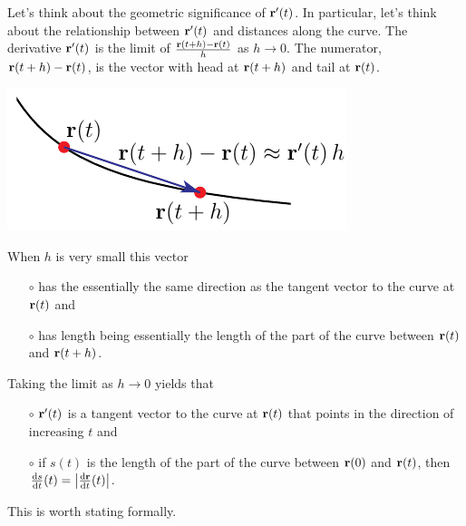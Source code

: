 Let's think about the geometric significance of $\mathbf{r}'(t)$.
In particular, let's think about the relationship between $\mathbf{r}'(t)$
and distances along the curve.
The derivative $\mathbf{r}'(t)$ is the limit of   $\frac{\mathbf{r}(t+h)-\mathbf{r}(t)}{h}$ as $h\rightarrow 0$. 
The numerator, $\mathbf{r}(t+h)-\mathbf{r}(t)$, is the vector with head at $\mathbf{r}(t+h)$ 
and tail at $\mathbf{r}(t)$. 
\begin{efig}
\begin{center}
     \includegraphics{parCurveDeriv.pdf}
\end{center}
\end{efig}
When $h$ is very small this vector
\begin{itemize}\itemsep1pt \parskip0pt  %
\item[$\circ$]
has the essentially the same direction as the tangent vector to the curve at $\mathbf{r}(t)$ and
\item[$\circ$]
has length being essentially the length of the part of the curve between
$\mathbf{r}(t)$ and $\mathbf{r}(t+h)$.
\end{itemize}
Taking the limit as $h\rightarrow 0$ yields that
\begin{itemize}\itemsep1pt \parskip0pt  %
\item[$\circ$]
$\mathbf{r}'(t)$ is a tangent vector to the curve at $\mathbf{r}(t)$ that points in
the direction of increasing $t$ and
\item[$\circ$]
if $s(t)$ is the length of the part of the curve between
$\mathbf{r}(0)$ and $\mathbf{r}(t)$, then  $\diff{s}{t}(t)=\big|\diff{\vr}{t}(t)\big|$.
\end{itemize}
This is worth stating formally.

